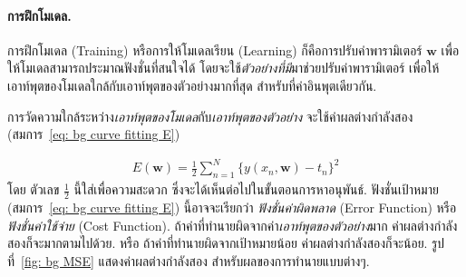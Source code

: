 \paragraph{การฝึกโมเดล.}

การฝึกโมเดล (Training) หรือการให้โมเดลเรียน (Learning) ก็คือการปรับค่าพารามิเตอร์ $\mathbf{w}$ เพื่อให้โมเดลสามารถประมาณฟังชั่นที่สนใจได้
โดยจะใช้\textit{ตัวอย่างที่มี}มาช่วยปรับค่าพารามิเตอร์ เพื่อให้เอาท์พุตของโมเดลใกล้กับเอาท์พุตของตัวอย่างมากที่สุด สำหรับที่ค่าอินพุตเดียวกัน.

การวัดความใกล้ระหว่าง\textit{เอาท์พุตของโมเดล}กับ\textit{เอาท์พุตของตัวอย่าง}
จะใช้ค่าผลต่างกำลังสอง (สมการ~\ref{eq: bg curve fitting E})

\begin{eqnarray}
E(\mathbf{w}) = \frac{1}{2} \sum_{n=1}^N \{ y(x_n, \mathbf{w}) - t_n \}^2
\label{eq: bg curve fitting E}
\end{eqnarray}
โดย ตัวเลข $\frac{1}{2}$ นี้ใส่เพื่อความสะดวก ซึ่งจะได้เห็นต่อไปในขั้นตอนการหาอนุพันธ์.
%
ฟังชั่นเป้าหมาย (สมการ~\ref{eq: bg curve fitting E}) นี้อาจจะเรียกว่า \textit{ฟังชั่นค่าผิดพลาด} (Error Function) หรือ\textit{ฟังชั่นค่าใช้จ่าย} (Cost Function).
%
ถ้าค่าที่ทำนายผิดจากค่า\textit{เอาท์พุตของตัวอย่าง}มาก ค่าผลต่างกำลังสองก็จะมากตามไปด้วย.
หรือ ถ้าค่าที่ทำนายผิดจากเป้าหมายน้อย ค่าผลต่างกำลังสองก็จะน้อย.
รูปที่~\ref{fig: bg MSE} แสดงค่าผลต่างกำลังสอง สำหรับผลของการทำนายแบบต่างๆ.

